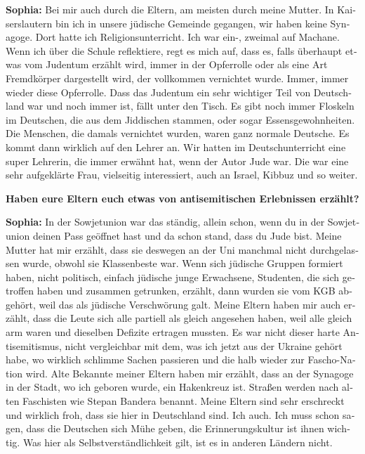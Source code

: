 \begin{otherlanguage}{ngerman}
\textbf{Sophia:} Bei mir auch durch die Eltern, am meisten durch meine Mutter. In Kaiserslautern bin ich in unsere jüdische Gemeinde gegangen, wir haben keine Synagoge. Dort hatte ich Religionsunterricht. Ich war ein-, zweimal auf Machane. Wenn ich über die Schule reflektiere, regt es mich auf, dass es, falls überhaupt etwas vom Judentum erzählt wird, immer in der Opferrolle oder als eine Art Fremdkörper dargestellt wird, der vollkommen vernichtet wurde. Immer, immer wieder diese Opferrolle. Dass das Judentum ein sehr wichtiger Teil von Deutschland war und noch immer ist, fällt unter den Tisch. Es gibt noch immer Floskeln im Deutschen, die aus dem Jiddischen stammen, oder sogar Essensgewohnheiten. Die Menschen, die damals vernichtet wurden, waren ganz normale Deutsche. Es kommt dann wirklich auf den Lehrer an. Wir hatten im Deutschunterricht eine super Lehrerin, die immer erwähnt hat, wenn der Autor Jude war. Die war eine sehr aufgeklärte Frau, vielseitig interessiert, auch an Israel, Kibbuz und so weiter. 

\textbf{Haben eure Eltern euch etwas von antisemitischen Erlebnissen erzählt?}\par                                                 \textbf{Sophia:} In der Sowjetunion war das ständig, allein schon, wenn du in der Sowjetunion deinen Pass geöffnet hast und da schon stand, dass du Jude bist. Meine Mutter hat mir erzählt, dass sie deswegen an der Uni manchmal nicht durchgelassen wurde, obwohl sie Klassenbeste war. Wenn sich jüdische Gruppen formiert haben, nicht politisch, einfach jüdische junge Erwachsene, Studenten, die sich getroffen haben und zusammen getrunken, erzählt, dann wurden sie vom KGB abgehört, weil das als jüdische Verschwörung galt. Meine Eltern haben mir auch erzählt, dass die Leute sich alle partiell als gleich angesehen haben, weil alle gleich arm waren und dieselben Defizite ertragen mussten. Es war nicht dieser harte Antisemitismus, nicht vergleichbar mit dem, was ich jetzt aus der Ukraine gehört habe, wo wirklich schlimme Sachen passieren und die halb wieder zur Fascho-Nation wird. Alte Bekannte meiner Eltern haben mir erzählt, dass an der Synagoge in der Stadt, wo ich geboren wurde, ein Hakenkreuz ist. Straßen werden nach alten Faschisten wie Stepan Bandera benannt. Meine Eltern sind sehr erschreckt und wirklich froh, dass sie hier in Deutschland sind. Ich auch. Ich muss schon sagen, dass die Deutschen sich Mühe geben, die Erinnerungskultur ist ihnen wichtig. Was hier als Selbstverständlichkeit gilt, ist es in anderen Ländern nicht. 


\end{otherlanguage}
